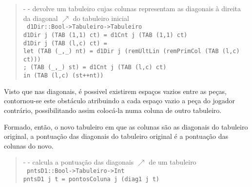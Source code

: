\documentclass[a4paper,titlepage]{scrreprt}
\begin{document}
			\begin{quote}
				{\small - - devolve um tabuleiro cujas colunas representam as diagonais à direita da diagonal $\nearrow$ do tabuleiro inicial\\}
				{\tt
				d1Dir::Bool->Tabuleiro->Tabuleiro\\
				d1Dir j (TAB (1,1) ct) = d1Cnt j (TAB (1,1) ct)\\
				d1Dir j (TAB (l,c) ct) =\\
				{\small let (TAB (\_,\_) nt) = d1Dir j (remUltLin (remPrimCol (TAB (l,c) ct)))}\\
				;	(TAB (\_,\_) st) = d1Cnt j (TAB (l,c) ct)\\
				in	(TAB (l,c) (st++nt))
				}
			\end{quote}
			Visto que nas diagonais, é possivel existirem espaços vazios entre as peças, contornou-se este obstáculo atribuindo a cada
			espaço vazio a peça do jogador contrário, possibilitando assim colocá-la numa coluna de outro tabuleiro.
			
			Formado, então, o novo tabuleiro em que as colunas são as diagonais do tabuleiro original, a pontuação das diagonais do tabuleiro
			original é a pontuação das colunas do novo.
			\begin{quote}
				{\small - - calcula a pontuação das diagonais $\nearrow$ de um tabuleiro\\}
				{\tt
				pntsD1::Bool->Tabuleiro->Int\\
				pntsD1 j t = pontosColuna j (diag1 j t)
				}
			\end{quote}
\end{document}
